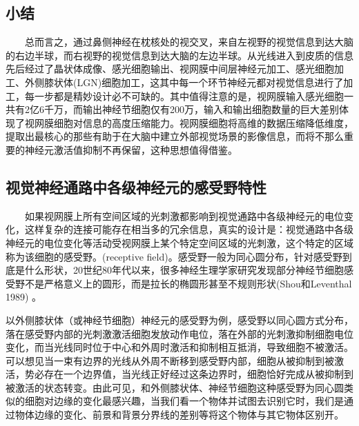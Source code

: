 \documentclass{article}
\begin{document}
\begin{spacing}{1.0}
\subsection{小结}
\ \ \ \ 总而言之，通过鼻侧神经在枕核处的视交叉，来自左视野的视觉信息到达大脑的右边半球，而右视野的视觉信息到达大脑的左边半球。从光线进入到皮质的信息先后经过了晶状体成像、感光细胞输出、视网膜中间层神经元加工、感光细胞加工、外侧膝状体(LGN)细胞加工，这其中每一个环节神经元都对视觉信息进行了加工，每一步都是精妙设计必不可缺的。其中值得注意的是，视网膜输入感光细胞一共有2亿6千万，而输出神经节细胞仅有200万，输入和输出细胞数量的巨大差别体现了视网膜细胞对信息的高度压缩能力。视网膜细胞将高维的数据压缩降低维度，提取出最核心的那些有助于在大脑中建立外部视觉场景的影像信息，而将不那么重要的神经元激活值抑制不再保留，这种思想值得借鉴。
\subsection{视觉神经通路中各级神经元的感受野特性}
\ \ \ \ 如果视网膜上所有空间区域的光刺激都影响到视觉通路中各级神经元的电位变化，这样复杂的连接可能存在相当多的冗余信息，真实的设计是：视觉通路中各级神经元的电位变化等活动受视网膜上某个特定空间区域的光刺激，这个特定的区域称为该细胞的感受野。(receptive field)。感受野一般为同心圆分布，针对感受野到底是什么形状，20世纪80年代以来，很多神经生理学家研究发现部分神经节细胞感受野不是严格意义上的圆形，而是拉长的椭圆形甚至不规则形状(Shou和Leventhal 1989)\cite{hsh}  。\par  以外侧膝状体（或神经节细胞）神经元的感受野为例，感受野以同心圆方式分布，落在感受野内部的光刺激激活细胞发放动作电位，落在外部的光刺激抑制细胞电位变化，而当光线同时位于中心和外周时激活和抑制相互抵消，导致细胞不被激活。可以想见当一束有边界的光线从外周不断移到感受野内部，细胞从被抑制到被激活，势必存在一个边界值，当光线正好经过这条边界时，细胞恰好完成从被抑制到被激活的状态转变。由此可见，和外侧膝状体、神经节细胞这种感受野为同心圆类似的细胞对边缘的变化最感兴趣，当我们看一个物体并试图去识别它时，我们是通过物体边缘的变化、前景和背景分界线的差别等将这个物体与其它物体区别开。\par 

\end{spacing}
\end{document}
